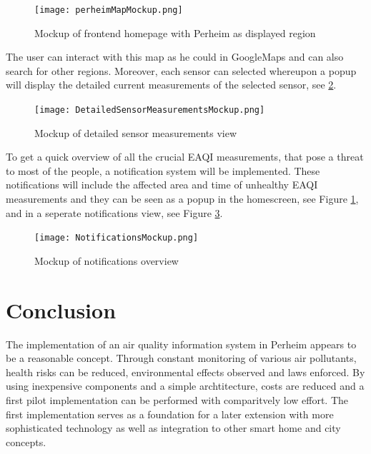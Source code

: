 \documentclass[conference]{IEEEtran}
\begin{document}
\begin{figure}[htbp]
	\centering
	\texttt{[image: perheimMapMockup.png]}
	\caption{Mockup of frontend homepage with Perheim as displayed region}
	\label{fig:perheimMapMockup}
\end{figure}

The user can interact with this map as he could in GoogleMaps and can also search for other regions. Moreover, each sensor can selected whereupon a popup will display the detailed current measurements of the selected sensor, see \ref{fig:DetailedSensorMeasurementsMockup}.

\begin{figure}[htbp]
	\centering
	\texttt{[image: DetailedSensorMeasurementsMockup.png]}
	\caption{Mockup of detailed sensor measurements view}
	\label{fig:DetailedSensorMeasurementsMockup}
\end{figure}

To get a quick overview of all the crucial EAQI measurements, that pose a threat to most of the people, a notification system will be implemented. These notifications will include the affected area and time of unhealthy EAQI measurements and they can be seen as a popup in the homescreen, see Figure \ref{fig:perheimMapMockup}, and in a seperate notifications view, see Figure \ref{fig:NotificationsMockup}.

\begin{figure}[htbp]
	\centering
	\texttt{[image: NotificationsMockup.png]}
	\caption{Mockup of notifications  overview}
	\label{fig:NotificationsMockup}
\end{figure}

\section{Conclusion}
The implementation of an air quality information system in Perheim appears to be a reasonable concept. Through constant monitoring of various air pollutants, health risks can be reduced, environmental effects observed and laws enforced. By using inexpensive components and a simple archtitecture, costs are reduced and a first pilot implementation can be performed with comparitvely low effort. The first implementation serves as a foundation for a later extension with more sophisticated technology as well as integration to other smart home and city concepts. 




\end{document}
